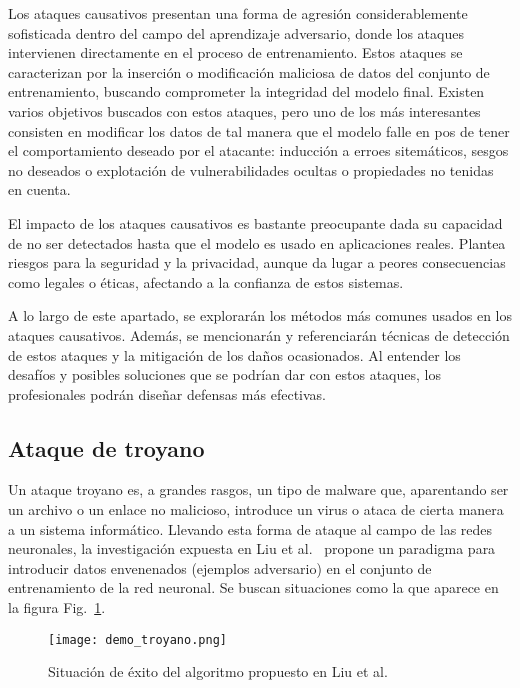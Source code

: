 Los ataques causativos presentan una forma de agresión considerablemente sofisticada dentro del campo del aprendizaje adversario, donde los ataques intervienen directamente en el proceso de entrenamiento. Estos ataques se caracterizan por la inserción o modificación maliciosa de datos del conjunto de entrenamiento, buscando comprometer la integridad del modelo final. Existen varios objetivos buscados con estos ataques, pero uno de los más interesantes consisten en modificar los datos de tal manera que el modelo falle en pos de tener el comportamiento deseado por el atacante: inducción a erroes sitemáticos, sesgos no deseados o explotación de vulnerabilidades ocultas o propiedades no tenidas en cuenta.

El impacto de los ataques causativos es bastante preocupante dada su capacidad de no ser detectados hasta que el modelo es usado en aplicaciones reales. Plantea riesgos para la seguridad y la privacidad, aunque da lugar a peores consecuencias como legales o éticas, afectando a la confianza de estos sistemas.

A lo largo de este apartado, se explorarán los métodos más comunes usados en los ataques causativos. Además, se mencionarán y referenciarán técnicas de detección de estos ataques y la mitigación de los daños ocasionados. Al entender los desafíos y posibles soluciones que se podrían dar con estos ataques, los profesionales podrán diseñar defensas más efectivas.


\subsection*{Ataque de troyano}

Un ataque troyano es, a grandes rasgos, un tipo de malware que, aparentando ser un archivo o un enlace no malicioso, introduce un virus o ataca de cierta manera a un sistema informático. Llevando esta forma de ataque al campo de las redes neuronales, la investigación expuesta en Liu et al.~\cite{TroyanoCausativo} propone un paradigma para introducir datos envenenados (ejemplos adversario) en el conjunto de entrenamiento de la red neuronal. Se buscan situaciones como la que aparece en la figura Fig.~\ref{fig:troyano_demo}.

\begin{figure}[h]
    \centering
    \texttt{[image: demo\_troyano.png]}
    \caption{Situación de éxito del algoritmo propuesto en Liu et al.\cite{TroyanoCausativo}}
    \label{fig:troyano_demo}
\end{figure}

